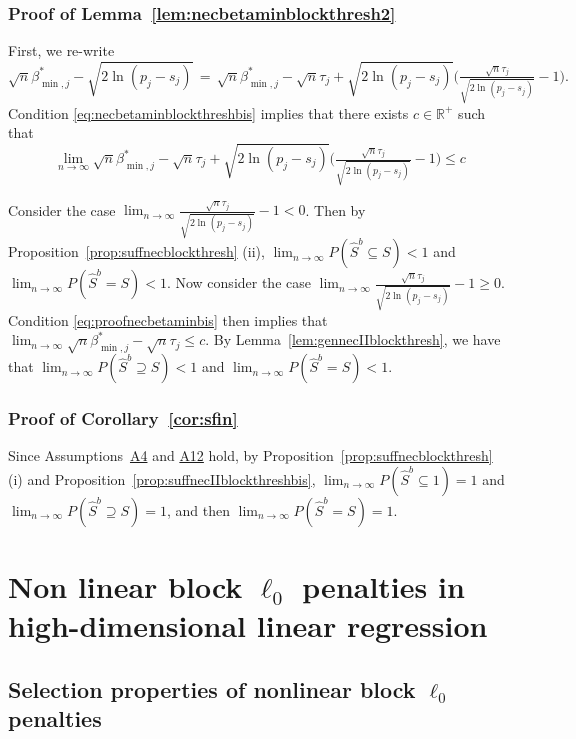 \documentclass[bj,authoryear]{imsart}
\theoremstyle{plain}
\newcommand{\R}{\mathbb{R}}
\begin{document}
\subsubsection{Proof of Lemma~\ref{lem:necbetaminblockthresh2}}
 First, we re-write 
 $$\sqrt{n}\beta_{\min,j}^*-\sqrt{2\ln(p_j-s_j)} \,=\, \sqrt{n}\beta_{\min,j}^*-\sqrt{n}\tau_j+\sqrt{2\ln(p_j-s_j)}\Big(\tfrac{\sqrt{n}\tau_j}{\sqrt{2\ln(p_j-s_j)}}-1\Big).$$ 
 Condition \eqref{eq:necbetaminblockthreshbis} implies that there exists $c\in\R^+$ such that
  \begin{equation}\label{eq:proofnecbetaminbis}
      \lim_{n\to \infty}\sqrt{n}\beta_{\min,j}^*-\sqrt{n}\tau_j+\sqrt{2\ln(p_j-s_j)}\Big(\tfrac{\sqrt{n}\tau_j}{\sqrt{2\ln(p_j-s_j)}}-1\Big)\leq c
  \end{equation}

Consider the case $\lim_{n\to \infty}\tfrac{\sqrt{n}\tau_j}{\sqrt{2\ln(p_j-s_j)}}-1<0$. Then by Proposition~\ref{prop:suffnecblockthresh} (ii),
$\lim_{n\to \infty}P(\hat{S}^{b} \subseteq S)< 1$ and $\lim_{n\to \infty}P(\hat{S}^{b} = S)< 1$.  Now consider the case $\lim_{n\to \infty}\tfrac{\sqrt{n}\tau_j}{\sqrt{2\ln(p_j-s_j)}}-1 \geq0$. Condition \eqref{eq:proofnecbetaminbis} then implies that $\lim_{n\to \infty}\sqrt{n}\beta_{\min,j}^*-\sqrt{n}\tau_j \leq c$. By Lemma~\ref{lem:gennecIIblockthresh}, we have that $\lim_{n\to \infty}P(\hat{S}^{b} \supseteq S)< 1$ and $\lim_{n\to \infty}P(\hat{S}^{b} = S)< 1$.

\subsubsection{Proof of Corollary~\ref{cor:sfin}} Since Assumptions~\hyperlink{lab:A4}{A4} and \hyperlink{lab:A12}{A12} hold, by Proposition~\ref{prop:suffnecblockthresh} (i) and Proposition~\ref{prop:suffnecIIblockthreshbis}, $\lim_{n\to \infty}P(\hat{S}^b \subseteq 1)= 1$ and $\lim_{n\to \infty}P( \hat{S}^b \supseteq S)=1$, and then $\lim_{n\to \infty}P(\hat{S}^b = S)=1$.

\section{Non linear block $\ell_0$ penalties in high-dimensional linear regression}\label{suppsec:appendixnonlinear}

\subsection{Selection properties of nonlinear block $\ell_0$ penalties}
\end{document}
